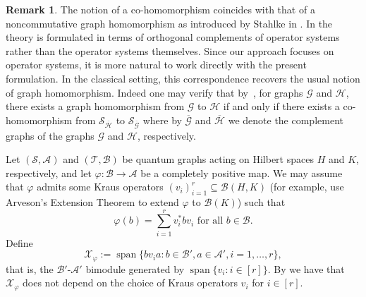 \documentclass[11pt]{amsart}
\numberwithin{equation}{section}
\theoremstyle{plain}
\theoremstyle{definition}
\newtheorem{remark}[theorem]{Remark}
\theoremstyle{remark}
\newcommand{\A}{{\mathcal{A}}}
\newcommand{\B}{{\mathcal{B}}}
\newcommand{\G}{{\mathcal{G}}}
\renewcommand{\H}{{\mathcal{H}}}
\renewcommand{\S}{{\mathcal{S}}}
\newcommand{\T}{{\mathcal{T}}}
\newcommand{\X}{{\mathcal{X}}}
\newcommand\vphi{\varphi}
\newcommand{\foral}{\text{ for all }}
\newcommand{\ol}{\overline}
\newcommand{\spn}{\operatorname{span}}
\begin{document}
\begin{remark}
The notion of a co-homomorphism \cite{EKT21} coincides with that of a noncommutative graph homomorphism as introduced by Stahlke in \cite{Sta16}. In \cite{Sta16} the theory is formulated in terms of orthogonal complements of operator systems rather than the operator systems themselves. Since our approach focuses on operator systems, it is more natural to work directly with the present formulation. In the classical setting, this correspondence recovers the usual notion of graph homomorphism. Indeed one may verify that by~\cite[Theorem~8]{Sta16}, for graphs $\G$ and $\H$, there exists a graph homomorphism from $\G$ to $\H$ if and only if there exists a co-homomorphism from $\S_{\ol{\H}}$ to $\S_{\ol{\G}}$ 
where by $\ol{\G}$ and $\ol{\H}$ we denote the complement graphs of the graphs $\G$ and $\H$, respectively.
\end{remark}

Let $(\S,\A)$ and $(\T, \B)$ be quantum graphs acting on  Hilbert spaces $H$ and $K$, respectively, and let $ \vphi \colon \B \to \A$ be a completely positive map. We may assume  that $\vphi$ admits some Kraus operators $(v_i)_{i=1}^r\subseteq \B(H,K)$ (for example, use Arveson's Extension Theorem to extend $\vphi$ to $\B(K)$) such that 
\[
\vphi(b) = \sum_{i=1}^rv_i^* b v_i \foral b\in \B.
\]
Define 
\[
\X_{\vphi}:= \spn\{bv_ia: b\in \B', a \in \A', i=1,\dots,r\},
\]
that is, the $\B'$-$\A'$ bimodule generated by $ \spn\{v_i:i\in [r]\}$.
By \cite[Proposition 6.1]{KL26} we have that $\X_\vphi$ does not depend on the choice of Kraus operators $v_i$ for $i \in [r]$.
\end{document}
